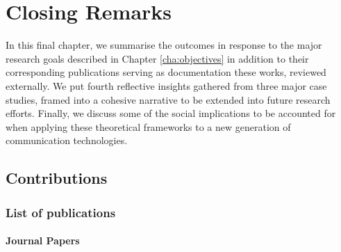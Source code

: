 



\chapter{Closing Remarks}
\label{cha:conclusion}

In this final chapter, we summarise the outcomes in response to the major research goals described in Chapter \ref{cha:objectives} in addition to their corresponding publications serving as documentation these works, reviewed externally. We put fourth reflective insights gathered from three major case studies, framed into a cohesive narrative to be extended into future research efforts. Finally, we discuss some of the social implications to be accounted for when applying these theoretical frameworks to a new generation of communication technologies.

\section{Contributions}

\subsection{List of publications}

\subsubsection{Journal Papers}

